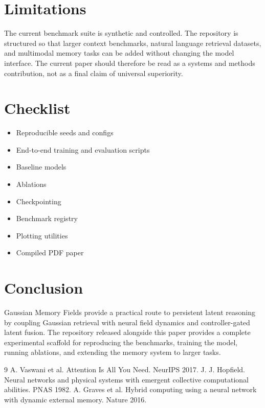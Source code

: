 \documentclass{article}
\begin{document}
\section{Limitations}
The current benchmark suite is synthetic and controlled. The repository is structured so that larger context benchmarks, natural language retrieval datasets, and multimodal memory tasks can be added without changing the model interface. The current paper should therefore be read as a systems and methods contribution, not as a final claim of universal superiority.

\section{Checklist}
\begin{itemize}[leftmargin=*]
\item Reproducible seeds and configs
\item End-to-end training and evaluation scripts
\item Baseline models
\item Ablations
\item Checkpointing
\item Benchmark registry
\item Plotting utilities
\item Compiled PDF paper
\end{itemize}

\section{Conclusion}
Gaussian Memory Fields provide a practical route to persistent latent reasoning by coupling Gaussian retrieval with neural field dynamics and controller-gated latent fusion. The repository released alongside this paper provides a complete experimental scaffold for reproducing the benchmarks, training the model, running ablations, and extending the memory system to larger tasks.

\begin{thebibliography}{9}
 A. Vaswani et al. Attention Is All You Need. NeurIPS 2017.
 J. J. Hopfield. Neural networks and physical systems with emergent collective computational abilities. PNAS 1982.
 A. Graves et al. Hybrid computing using a neural network with dynamic external memory. Nature 2016.
\end{thebibliography}
\end{document}
